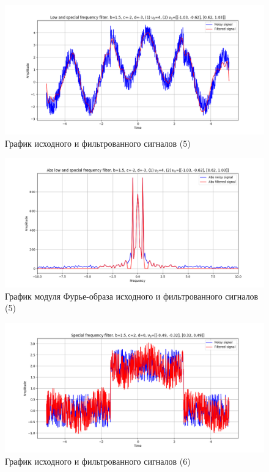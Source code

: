 \documentclass[a4paper, 12pt]{article}
\begin{document}
    \begin{figure}[H]
        \centering
        \includegraphics[scale=0.48]{5_3_u_flt_u_nospec.png}
        \captionsetup{skip=0pt}
        \caption{График исходного и фильтрованного сигналов (5)}
        \label{fig:fig07}
    \end{figure}
    \begin{figure}[!htb]
        \centering
        \includegraphics[scale=0.48]{5_3_abs_u_U_nospec.png}
        \captionsetup{skip=0pt}
        \caption{График модуля Фурье-образа исходного и фильтрованного сигналов (5)}
        \label{fig:fig08}
    \end{figure}
    \begin{figure}[!htb]
        \centering
        \includegraphics[scale=0.48]{6_u_flt_u_nospec.png}
        \captionsetup{skip=0pt}
        \caption{График исходного и фильтрованного сигналов (6)}
        \label{fig:mlll}
    \end{figure}
\end{document}
